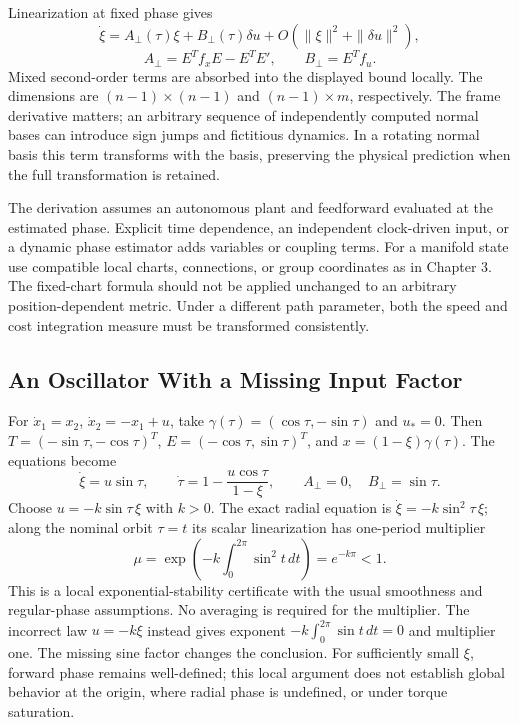 Linearization at fixed phase gives
\begin{equation}\label{eq:transverse_linear}
 \dot\xi=A_\perp(\tau)\xi+B_\perp(\tau)\delta u
       +O(\|\xi\|^2+\|\delta u\|^2),
\end{equation}
\begin{equation}\label{eq:transverse_practical}
 A_\perp=E^Tf_xE-E^TE',\qquad B_\perp=E^Tf_u.
\end{equation}
Mixed second-order terms are absorbed into the displayed bound locally.
The dimensions are $(n-1)\times(n-1)$ and $(n-1)\times m$, respectively.
The frame derivative matters; an arbitrary sequence of independently computed
normal bases can introduce sign jumps and fictitious dynamics. In a rotating
normal basis this term transforms with the basis, preserving the physical
prediction when the full transformation is retained.

The derivation assumes an autonomous plant and feedforward evaluated at the
estimated phase. Explicit time dependence, an independent clock-driven input,
or a dynamic phase estimator adds variables or coupling terms. For a manifold
state use compatible local charts, connections, or group coordinates as in
Chapter 3. The fixed-chart formula should not be applied unchanged to an
arbitrary position-dependent metric. Under a different path parameter, both
the speed and cost integration measure must be transformed consistently.

\subsection{An Oscillator With a Missing Input Factor}

For $\dot x_1=x_2$, $\dot x_2=-x_1+u$, take
$\gamma(\tau)=(\cos\tau,-\sin\tau)$ and $u_*=0$. Then
$T=(-\sin\tau,-\cos\tau)^T$, $E=(-\cos\tau,\sin\tau)^T$, and
$x=(1-\xi)\gamma(\tau)$. The equations become
\begin{equation}\label{eq:orbital_oscillator}
 \dot\xi=u\sin\tau,\qquad
 \dot\tau=1-\frac{u\cos\tau}{1-\xi},\qquad
 A_\perp=0,\quad B_\perp=\sin\tau.
\end{equation}
Choose $u=-k\sin\tau\,\xi$ with $k>0$. The exact radial equation is
$\dot\xi=-k\sin^2\tau\,\xi$; along the nominal orbit $\tau=t$ its scalar
linearization has one-period multiplier
\begin{equation}\label{eq:orbital_oscillator_multiplier}
 \mu=\exp\!\left(-k\int_0^{2\pi}\sin^2t\,dt\right)=e^{-k\pi}<1.
\end{equation}
This is a local exponential-stability certificate with the usual smoothness
and regular-phase assumptions. No averaging is required for the multiplier.
The incorrect law $u=-k\xi$ instead gives exponent
$-k\int_0^{2\pi}\sin t\,dt=0$ and multiplier one. The missing sine factor
changes the conclusion. For sufficiently small $\xi$, forward phase remains
well-defined; this local argument does not establish global behavior at the
origin, where radial phase is undefined, or under torque saturation.

